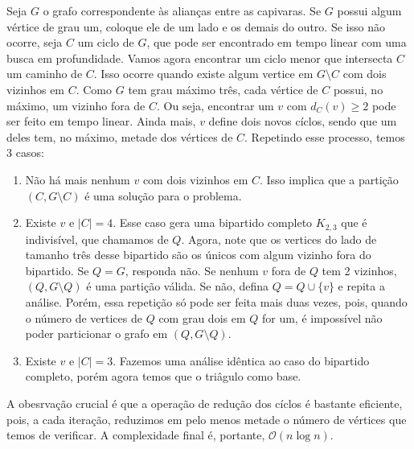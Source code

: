 Seja $G$ o grafo correspondente às alianças entre as capivaras.
Se $G$ possui algum vértice de grau um, coloque ele de um lado e os demais do outro.
Se isso não ocorre, seja $C$ um ciclo de $G$, que pode ser encontrado em tempo linear
com uma busca em profundidade.
Vamos agora encontrar um ciclo menor que intersecta $C$ um caminho de $C$. Isso ocorre
quando existe algum vertice em $G \setminus C$ com dois vizinhos em $C$.
Como $G$ tem grau máximo três, cada vértice de $C$ possui, no máximo, um vizinho fora de $C$.
Ou seja, encontrar um $v$ com $d_C(v) \geq 2$ pode ser feito em tempo linear.
Ainda mais, $v$ define dois novos cíclos, sendo que um deles tem, no máximo, metade dos vértices de $C$.
Repetindo esse processo, temos 3 casos:
\begin{enumerate}
  \item Não há mais nenhum $v$ com dois vizinhos em $C$. Isso implica que a partição $(C, G \setminus C)$ é
  uma solução para o problema.
  \item Existe $v$ e $|C| = 4$. Esse caso gera uma bipartido completo $K_{2,3}$ que é indivisível, que chamamos de $Q$.
  Agora, note que os vertices  do lado de tamanho três desse bipartido são os únicos com algum vizinho fora do bipartido.
  Se $Q = G$, responda não.
  Se nenhum $v$  fora de $Q$ tem 2 vizinhos, $(Q, G \setminus Q)$ é uma partição válida.
  Se não, defina $Q = Q \cup \{v\}$ e repita a análise. Porém, essa repetição só pode ser feita mais duas vezes,
  pois, quando o número de vertices de $Q$ com grau dois em $Q$ for um, é impossível não poder particionar o grafo em
  $(Q, G \setminus Q)$.
  \item Existe $v$ e $|C| = 3$. Fazemos uma análise idêntica ao caso do bipartido completo, porém agora temos que o triâgulo como base.
\end{enumerate}

A obesrvação crucial é que a operação de redução dos cíclos é bastante eficiente, pois, a cada iteração, reduzimos em pelo menos metade
o número de vértices que temos de verificar. A complexidade final é, portante, $\mathcal{O}(n \log n)$.
